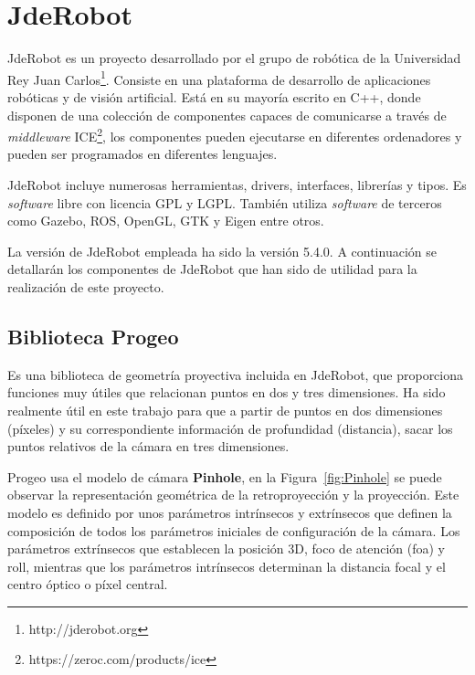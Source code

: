 \section{JdeRobot}\label{jderobot}

JdeRobot es un proyecto desarrollado por el grupo de robótica de la Universidad Rey Juan Carlos\footnote{http://jderobot.org}. Consiste en una plataforma de desarrollo de aplicaciones robóticas y de visión artificial. Está en su mayoría escrito en C++, donde disponen de una colección de componentes capaces de comunicarse a través de \textit{middleware} ICE\footnote{https://zeroc.com/products/ice}, los componentes pueden ejecutarse en diferentes ordenadores y pueden ser programados en diferentes lenguajes.

JdeRobot incluye numerosas herramientas, drivers, interfaces, librerías y tipos. Es \textit{software} libre con licencia GPL y LGPL. También utiliza \textit{software} de terceros como Gazebo, ROS, OpenGL, GTK y Eigen entre otros.

La versión de JdeRobot empleada ha sido la versión 5.4.0. A continuación se detallarán los componentes de JdeRobot que han sido de utilidad para la realización de este proyecto.

\subsection{Biblioteca Progeo}

Es una biblioteca de geometría proyectiva incluida en JdeRobot, que proporciona funciones muy útiles que relacionan puntos en dos y tres dimensiones. Ha sido realmente útil en este trabajo para que a partir de puntos en dos dimensiones (píxeles) y su correspondiente información de profundidad (distancia), sacar los puntos relativos de la cámara en tres dimensiones.

Progeo usa el modelo de cámara \textbf{Pinhole}, en la Figura~\ref{fig:Pinhole} se puede observar la representación geométrica de la retroproyección y la proyección. Este modelo es definido por unos parámetros intrínsecos y extrínsecos que definen la composición de todos los parámetros iniciales de configuración de la cámara. Los parámetros extrínsecos que establecen la posición 3D, foco de atención (foa) y roll, mientras que los parámetros intrínsecos determinan la distancia focal y el centro óptico o píxel central.

